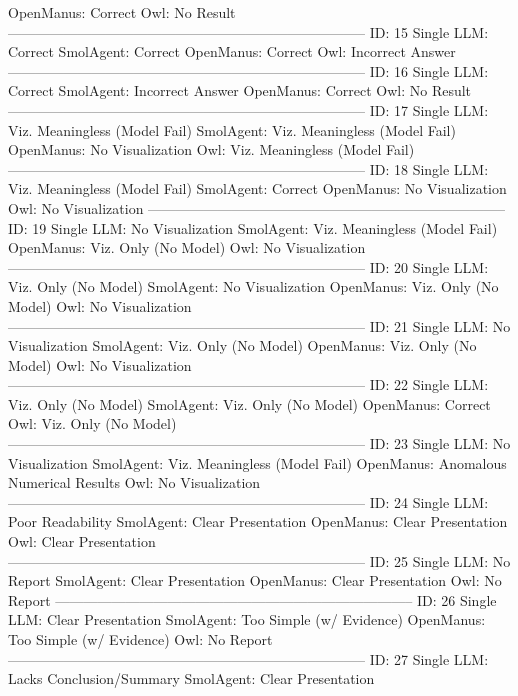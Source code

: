 \begin{tcolorbox}[colback=cadmiumgreen!5!white,colframe=forestgreen!75!white,breakable,title=\textit{Human evaluation results in task 4.}]
\begin{VerbatimWrap}
OpenManus: Correct 
Owl: No Result 
-----------------------------------------------------------------------------
ID: 15 
Single LLM: Correct 
SmolAgent: Correct 
OpenManus: Correct 
Owl: Incorrect Answer 
-----------------------------------------------------------------------------
ID: 16 
Single LLM: Correct 
SmolAgent: Incorrect Answer 
OpenManus: Correct 
Owl: No Result 
-----------------------------------------------------------------------------
ID: 17 
Single LLM: Viz. Meaningless (Model Fail) 
SmolAgent: Viz. Meaningless (Model Fail) 
OpenManus: No Visualization 
Owl: Viz. Meaningless (Model Fail) 
-----------------------------------------------------------------------------
ID: 18 
Single LLM: Viz. Meaningless (Model Fail) 
SmolAgent: Correct 
OpenManus: No Visualization 
Owl: No Visualization 
-----------------------------------------------------------------------------
ID: 19 
Single LLM: No Visualization 
SmolAgent: Viz. Meaningless (Model Fail) 
OpenManus: Viz. Only (No Model) 
Owl: No Visualization 
-----------------------------------------------------------------------------
ID: 20 
Single LLM: Viz. Only (No Model) 
SmolAgent: No Visualization 
OpenManus: Viz. Only (No Model) 
Owl: No Visualization 
-----------------------------------------------------------------------------
ID: 21 
Single LLM: No Visualization 
SmolAgent: Viz. Only (No Model) 
OpenManus: Viz. Only (No Model) 
Owl: No Visualization 
-----------------------------------------------------------------------------
ID: 22 
Single LLM: Viz. Only (No Model) 
SmolAgent: Viz. Only (No Model) 
OpenManus: Correct 
Owl: Viz. Only (No Model) 
-----------------------------------------------------------------------------
ID: 23 
Single LLM: No Visualization 
SmolAgent: Viz. Meaningless (Model Fail) 
OpenManus: Anomalous Numerical Results 
Owl: No Visualization 
-----------------------------------------------------------------------------
ID: 24 
Single LLM: Poor Readability 
SmolAgent: Clear Presentation 
OpenManus: Clear Presentation 
Owl: Clear Presentation 
-----------------------------------------------------------------------------
ID: 25 
Single LLM: No Report 
SmolAgent: Clear Presentation 
OpenManus: Clear Presentation 
Owl: No Report 
-----------------------------------------------------------------------------
ID: 26 
Single LLM: Clear Presentation 
SmolAgent: Too Simple (w/ Evidence) 
OpenManus: Too Simple (w/ Evidence) 
Owl: No Report 
-----------------------------------------------------------------------------
ID: 27 
Single LLM: Lacks Conclusion/Summary 
SmolAgent: Clear Presentation 

\end{VerbatimWrap}
\end{tcolorbox}
